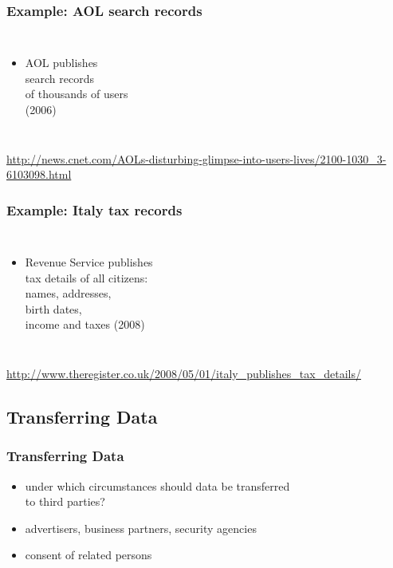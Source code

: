 \documentclass[dvipsnames]{beamer}
\theoremstyle{plain}
\begin{document}
\begin{frame}
  \frametitle{Example: AOL search records}

  \begin{columns}

    \begin{itemize}
      \item AOL publishes\\
        search records\\
        of thousands of users\\
        (2006)
    \end{itemize}
  \end{columns}

  \medskip
  \tiny{\url{http://news.cnet.com/AOLs-disturbing-glimpse-into-users-lives/2100-1030_3-6103098.html}}\\
\end{frame}

\begin{frame}
  \frametitle{Example: Italy tax records}

  \begin{columns}

    \begin{itemize}
      \item Revenue Service publishes\\
        tax details of all citizens:\\
        names, addresses,\\
        birth dates,\\
        income and taxes (2008)
    \end{itemize}
  \end{columns}

  \medskip
  \tiny{\url{http://www.theregister.co.uk/2008/05/01/italy_publishes_tax_details/}}\\
\end{frame}

\subsection{Transferring Data}

\begin{frame}
  \frametitle{Transferring Data}

  \begin{itemize}
    \item under which circumstances should data be transferred\\
      to third parties?
    \item advertisers, business partners, security agencies
    \item consent of related persons
  \end{itemize}
\end{frame}
\end{document}
